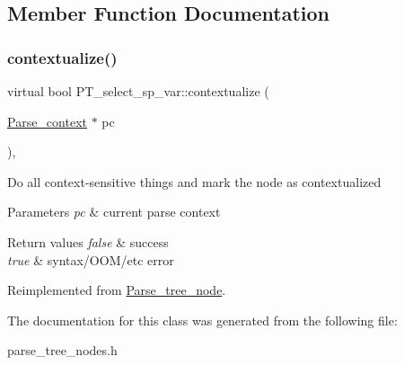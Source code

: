 \subsection{Member Function Documentation}
\mbox{\label{classPT__select__sp__var_ab4e2e87225264b63c7f099ca221a8e01}} 
\subsubsection{\texorpdfstring{contextualize()}{contextualize()}}
{\footnotesize\ttfamily virtual bool P\+T\+\_\+select\+\_\+sp\+\_\+var\+::contextualize (\begin{DoxyParamCaption}\item[{\mbox{\hyperlink{structParse__context}{Parse\+\_\+context}} $\ast$}]{pc }\end{DoxyParamCaption})\hspace{0.3cm}{\ttfamily [inline]}, {\ttfamily [virtual]}}

Do all context-\/sensitive things and mark the node as contextualized


\begin{DoxyParams}{Parameters}
{\em pc} & current parse context\\
\hline
\end{DoxyParams}

\begin{DoxyRetVals}{Return values}
{\em false} & success \\
\hline
{\em true} & syntax/\+O\+O\+M/etc error \\
\hline
\end{DoxyRetVals}


Reimplemented from \mbox{\hyperlink{classParse__tree__node_a22d93524a537d0df652d7efa144f23da}{Parse\+\_\+tree\+\_\+node}}.



The documentation for this class was generated from the following file\+:\begin{DoxyCompactItemize}
\item 
parse\+\_\+tree\+\_\+nodes.\+h\end{DoxyCompactItemize}
